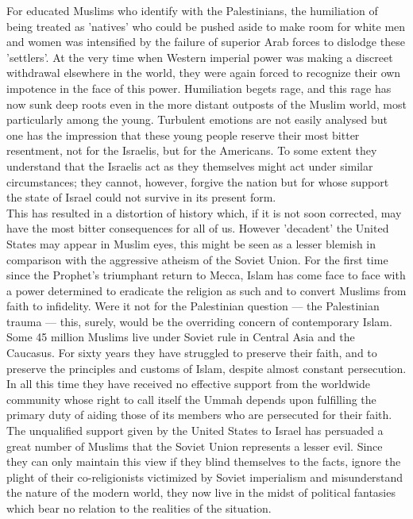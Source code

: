 \documentclass[10pt, twoside,openright]{book}
\begin{document}
For educated Muslims who identify with the Palestinians, the humiliation of being treated as 'natives' who could be pushed aside to make room for white men and women was intensified by the failure of superior Arab forces to dislodge these 'settlers'. At the very time when Western imperial power was making a discreet withdrawal elsewhere in the world, they were again forced to recognize their own impotence in the face of this power. Humiliation begets rage, and this rage has now sunk deep roots even in the more distant outposts of the Muslim world, most particularly among the young. Turbulent emotions are not easily analysed but one has the impression that these young people reserve their most bitter resentment, not for the Israelis, but for the Americans. To some extent they understand that the Israelis act as they themselves might act under similar circumstances; they cannot, however, forgive the nation but for whose support the state of Israel could not survive in its present form. \\

This has resulted in a distortion of history which, if it is not soon corrected, may have the most bitter consequences for all of us. However 'decadent' the United States may appear in Muslim eyes, this might be seen as a lesser blemish in comparison with the aggressive atheism of the Soviet Union. For the first time since the Prophet's triumphant return to Mecca, Islam has come face to face with a power determined to eradicate the religion as such and to convert Muslims from faith to infidelity. Were it not for the Palestinian question --- the Palestinian trauma --- this, surely, would be the overriding concern of contemporary Islam. Some 45 million Muslims live under Soviet rule in Central Asia and the Caucasus. For sixty years they have struggled to preserve their faith, and to preserve the principles and customs of Islam, despite almost constant persecution. In all this time they have received no effective support from the worldwide community whose right to call itself the Ummah depends upon fulfilling the primary duty of aiding those of its members who are persecuted for their faith. \\

The unqualified support given by the United States to Israel has persuaded a great number of Muslims that the Soviet Union represents a lesser evil. Since they can only maintain this view if they blind themselves to the facts, ignore the plight of their co\hyp{}religionists victimized by Soviet imperialism and misunderstand the nature of the modern world, they now live in the midst of political fantasies which bear no relation to the realities of the situation. \\
\end{document}
